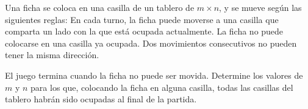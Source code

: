 Una ficha se coloca en una casilla de un tablero de $m\times n$, y se mueve según las siguientes reglas:  En cada turno, la ficha puede moverse a una casilla que comparta un lado con la que está ocupada actualmente. La ficha no puede colocarse en una casilla ya ocupada. Dos movimientos consecutivos no pueden tener la misma dirección.

El juego termina cuando la ficha no puede ser movida. Determine los valores de $m$ y $n$ para los que, colocando la ficha en alguna casilla, todas las casillas del tablero habrán sido ocupadas al final de la partida.
